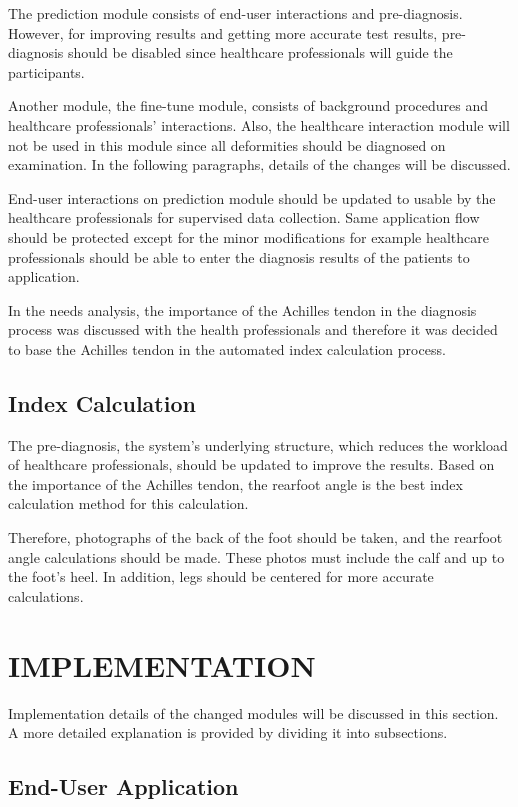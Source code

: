 The prediction module consists of end-user interactions and pre-diagnosis. However, for improving results and getting more accurate test results, pre-diagnosis should be disabled since healthcare professionals will guide the participants. 

Another module, the fine-tune module, consists of background procedures and healthcare professionals' interactions. Also, the healthcare interaction module will not be used in this module since all deformities should be diagnosed on examination. In the following paragraphs, details of the changes will be discussed.

End-user interactions on prediction module should be updated to usable by the healthcare professionals for supervised data collection. Same application flow should be protected except for the minor modifications for example healthcare professionals should be able to enter the diagnosis results of the patients to application.

In the needs analysis, the importance of the Achilles tendon in the diagnosis process was discussed with the health professionals and therefore it was decided to base the Achilles tendon in the automated index calculation process.

\subsection{ Index Calculation }

The pre-diagnosis, the system's underlying structure, which reduces the workload of healthcare professionals, should be updated to improve the results. Based on the importance of the Achilles tendon, the rearfoot angle is the best index calculation method for this calculation. 

Therefore, photographs of the back of the foot should be taken, and the rearfoot angle calculations should be made. These photos must include the calf and up to the foot's heel. In addition, legs should be centered for more accurate calculations.

\section{IMPLEMENTATION}\label{sec:StudyIIImplementation}

Implementation details of the changed modules will be discussed in this section. A more detailed explanation is provided by dividing it into subsections. 

\subsection{End-User Application}

